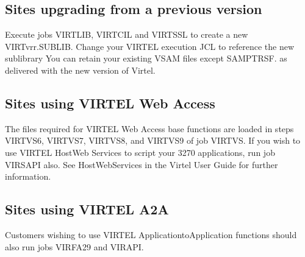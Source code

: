 \documentclass[letterpaper,10pt,english]{sphinxmanual}
\begin{document}
\subsection{Sites upgrading from a previous version}
\label{\detokenize{Installation_Guide:sites-upgrading-from-a-previous-version}}
\sphinxAtStartPar
Execute jobs VIRTLIB, VIRTCIL and VIRTSSL to create a new VIRTvrr.SUBLIB. Change your VIRTEL execution JCL to reference the new sublibrary You can retain your existing VSAM files except SAMPTRSF.  as delivered with the new version of Virtel.


\subsection{Sites using VIRTEL Web Access}
\label{\detokenize{Installation_Guide:sites-using-virtel-web-access}}
\sphinxAtStartPar
The files required for VIRTEL Web Access base functions are loaded in steps VIRTVS6, VIRTVS7, VIRTVS8, and VIRTVS9 of job VIRTVS. If you wish to use VIRTEL Host\sphinxhyphen{}Web Services to script your 3270 applications, run job VIRSAPI also. See Host\sphinxhyphen{}Web\sphinxhyphen{}Services in the Virtel User Guide for further information.


\subsection{Sites using VIRTEL A2A}
\label{\detokenize{Installation_Guide:sites-using-virtel-a2a}}
\sphinxAtStartPar
Customers wishing to use VIRTEL Application\sphinxhyphen{}to\sphinxhyphen{}Application functions should also run jobs VIRFA29 and VIRAPI.
\end{document}

